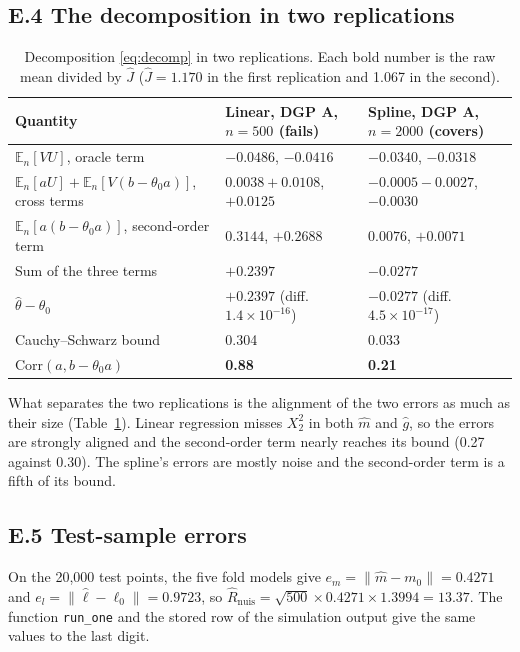 \documentclass[11pt,a4paper]{article}
\newcommand{\En}{\mathbb{E}_n}
\newcommand{\Rnuis}{\hat R_{\mathrm{nuis}}}
\newcommand{\code}[1]{\texttt{#1}}
\begin{document}
\subsection*{E.4 The decomposition in two replications}

\begin{table}[H]
\centering\footnotesize\setlength{\tabcolsep}{4pt}
\caption{Decomposition \eqref{eq:decomp} in two replications. Each bold number is the raw mean divided by $\hat J$ ($\hat J=1.170$ in the first replication and 1.067 in the second).}\label{tab:twoex}
\begin{tabular}{lll}
\toprule
Quantity & Linear, DGP A, $n=500$ (fails) & Spline, DGP A, $n=2000$ (covers)\\
\midrule
$\En[VU]$, oracle term & $-0.0486$, $\mathbf{-0.0416}$ & $-0.0340$, $\mathbf{-0.0318}$\\
$\En[aU]+\En[V(b-\theta_0a)]$, cross terms & $0.0038+0.0108$, $\mathbf{+0.0125}$ & $-0.0005-0.0027$, $\mathbf{-0.0030}$\\
$\En[a(b-\theta_0a)]$, second-order term & $0.3144$, $\mathbf{+0.2688}$ & $0.0076$, $\mathbf{+0.0071}$\\
Sum of the three terms & $+0.2397$ & $-0.0277$\\
$\hat\theta-\theta_0$ & $+0.2397$ (diff.\ $1.4\times10^{-16}$) & $-0.0277$ (diff.\ $4.5\times10^{-17}$)\\
Cauchy--Schwarz bound & 0.304 & 0.033\\
$\mathrm{Corr}(a,b-\theta_0a)$ & \textbf{0.88} & \textbf{0.21}\\
\bottomrule
\end{tabular}
\end{table}

What separates the two replications is the alignment of the two errors as much as their size (Table~\ref{tab:twoex}). Linear regression misses $X_2^2$ in both $\hat m$ and $\hat g$, so the errors are strongly aligned and the second-order term nearly reaches its bound (0.27 against 0.30). The spline's errors are mostly noise and the second-order term is a fifth of its bound.

\subsection*{E.5 Test-sample errors}

On the 20,000 test points, the five fold models give $e_m=\|\hat m-m_0\|=0.4271$ and $e_l=\|\hat\ell-\ell_0\|=0.9723$, so $\Rnuis=\sqrt{500}\times0.4271\times1.3994=13.37$. The function \code{run\_one} and the stored row of the simulation output give the same values to the last digit.
\end{document}

